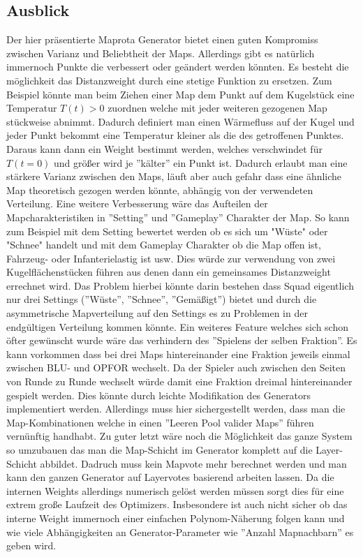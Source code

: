    \subsection{Ausblick}
        Der hier präsentierte Maprota Generator bietet einen guten Kompromiss zwischen Varianz und Beliebtheit der Maps. 
        Allerdings gibt es natürlich immernoch Punkte die verbessert oder geändert werden könnten.
        Es besteht die möglichkeit das Distanzweight durch eine stetige Funktion zu ersetzen. 
        Zum Beispiel könnte man beim Ziehen einer Map dem Punkt auf dem Kugelstück eine Temperatur $T(t)>0$ zuordnen welche mit jeder weiteren gezogenen Map stückweise abnimmt.
        Dadurch definiert man einen Wärmefluss auf der Kugel und jeder Punkt bekommt eine Temperatur kleiner als die des getroffenen Punktes. 
        Daraus kann dann ein Weight bestimmt werden, welches verschwindet für $T(t=0)$ und größer wird je ''kälter'' ein Punkt ist. 
        Dadurch erlaubt man eine stärkere Varianz zwischen den Maps, läuft aber auch gefahr dass eine ähnliche Map theoretisch gezogen werden könnte, abhängig von der verwendeten Verteilung.
        Eine weitere Verbesserung wäre das Aufteilen der Mapcharakteristiken in ''Setting'' und ''Gameplay'' Charakter der Map. 
        So kann zum Beispiel mit dem Setting bewertet werden ob es sich um "Wüste" oder "Schnee" handelt und mit dem Gameplay Charakter ob die Map offen ist, Fahrzeug- oder Infanterielastig ist usw. 
        Dies würde zur verwendung von zwei Kugelflächenstücken führen aus denen dann ein gemeinsames Distanzweight errechnet wird. 
        Das Problem hierbei könnte darin bestehen dass Squad eigentlich nur drei Settings (''Wüste'', ''Schnee'', ''Gemäßigt'') bietet und durch die asymmetrische Mapverteilung auf den Settings es zu Problemen in der endgültigen Verteilung kommen könnte.
        Ein weiteres Feature welches sich schon öfter gewünscht wurde wäre das verhindern des ''Spielens der selben Fraktion''.
        Es kann vorkommen dass bei drei Maps hintereinander eine Fraktion jeweils einmal zwischen BLU- und OPFOR wechselt. 
        Da der Spieler auch zwischen den Seiten von Runde zu Runde wechselt würde damit eine Fraktion dreimal hintereinander gespielt werden.
        Dies könnte durch leichte Modifikation des Generators implementiert werden. 
        Allerdings muss hier sichergestellt werden, dass man die Map-Kombinationen welche in einen ''Leeren Pool valider Maps'' führen vernünftig handhabt.
        Zu guter letzt wäre noch die Möglichkeit das ganze System so umzubauen das man die Map-Schicht im Generator komplett auf die Layer-Schicht abbildet.
        Dadruch muss kein Mapvote mehr berechnet werden und man kann den ganzen Generator auf Layervotes basierend arbeiten lassen.
        Da die internen Weights allerdings numerisch gelöst werden müssen sorgt dies für eine extrem große Laufzeit des Optimizers.
        Insbesondere ist auch nicht sicher ob das interne Weight immernoch einer einfachen Polynom-Näherung folgen kann und wie viele Abhängigkeiten an Generator-Parameter wie ''Anzahl Mapnachbarn'' es geben wird. 
